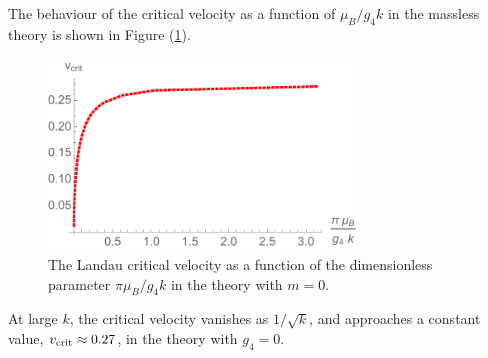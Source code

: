 The behaviour of the critical velocity as a function of $\mu_B/g_4 k$ in the massless theory is shown in Figure (\ref{vcrit}).
 \begin{figure}[h]
\begin{center}
\includegraphics[height=2.0in]{Chapter_3_Folder_1806.06976/figures/vcrit.pdf}
\end{center}
     \caption[This figure shows the Landau critical velocity as a function of the dimensionless parameter $\pi\frac{\mu_B}{g_4 k}$ in the theory with $m=0$.]{ \small{The Landau critical velocity as a function of the dimensionless parameter $\pi\mu_B/g_4 k$ in the theory with $m=0$.}}
\label{vcrit}
\end{figure}
 At large $k$, the critical velocity vanishes as $1/\sqrt{k}$, and approaches a constant value, $v_{\rm crit}\approx 0.27$, in the theory with $g_4=0$.
